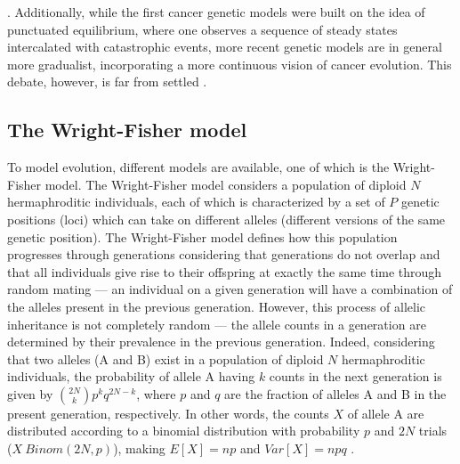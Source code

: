 \cite{Cannataro2018-ye,Schwartz2017-hg}. Additionally, while the first cancer genetic models were built on the idea of punctuated equilibrium, where one observes a sequence of steady states intercalated with catastrophic events, more recent genetic models are in general more gradualist, incorporating a more continuous vision of cancer evolution. This debate, however, is far from settled \cite{Beerenwinkel2015-xr,Sterelny2007-kp}. 

\subsection{The Wright-Fisher model}

To model evolution, different models are available, one of which is the Wright-Fisher model. The Wright-Fisher model considers a population of diploid $N$ hermaphroditic individuals, each of which is characterized by a set of $P$ genetic positions (loci) which can take on different alleles (different versions of the same genetic position). The Wright-Fisher model defines how this population progresses through generations considering that generations do not overlap and that all individuals give rise to their offspring at exactly the same time through random mating --- an individual on a given generation will have a combination of the alleles present in the previous generation. However, this process of allelic inheritance is not completely random --- the allele counts in a generation are determined by their prevalence in the previous generation. Indeed, considering that two alleles (A and B) exist in a population of diploid $N$ hermaphroditic individuals, the probability of allele A having $k$ counts in the next generation is given by $\binom{2N}{k}p^kq^{2N-k}$, where $p$ and $q$ are the fraction of alleles A and B in the present generation, respectively. In other words, the counts $X$ of allele A are distributed according to a binomial distribution with probability $p$ and $2N$ trials ($X~Binom(2N,p)$), making $E[X] = np$ and $Var[X] = npq$ \cite{Gillespie2004-xo}. 


